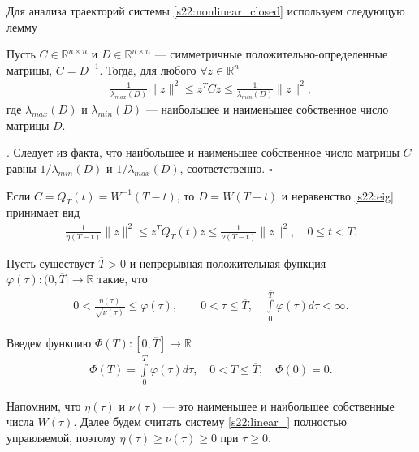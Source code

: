 \documentclass[../main.tex]{subfiles}
\begin{document}
Для анализа траекторий системы \eqref{s22:nonlinear_closed} используем следующую лемму
\begin{lemma}\label{s22:lem:zqz} 
 Пусть $C\in \mathbb{R}^{ n \times n}$ и $D\in \mathbb{R}^{n \times n}$ --- симметричные положительно-определенные матрицы, $C=D^{-1}$. 
Тогда, для любого $\forall z \in \mathbb{R}^{n}$ 
 \begin{gather} \label{s22:eig}
 \frac{1}{\lambda_{max}(D)} \|z\|^2 \leqslant z^T C z \leqslant \frac{1}{\lambda_{min}(D)} \|z\|^2,
 \end{gather}
 где $\lambda_{max}(D)$ и $\lambda_{min}(D)$ --- наибольшее и наименьшее собственное число матрицы $D$.
\end{lemma}
\doc. 
 Следует из факта, что наибольшее и наименьшее собственное число матрицы $C$ равны $1/{\lambda_{min}(D)}$ и $1/{\lambda_{max}(D)}$, соответственно. \hfill $ \square $

Если $C=Q_T(t)=W^{-1}(T-t)$, то $D=W(T-t)$ и неравенство \eqref{s22:eig} принимает вид
\begin{gather*} %
 \frac{1}{\eta(T-t)} \|z\|^2 \leqslant z^T Q_T(t) z \leqslant \frac{1}{\nu(T-t)} \|z\|^2, \quad 0\leqslant t < T.
 \end{gather*}
\begin{assumption} \label{s22:asm1} 
 Пусть существует $\overline{T}>0$ и непрерывная положительная функция $\varphi(\tau): (0, \overline{T}] \to \mathbb{R}$ такие, что
\begin{gather*}
 0 < \frac{\eta(\tau)}{\sqrt{\nu(\tau)}} \leqslant \varphi(\tau), \qquad 0 < \tau \leqslant \overline{T},\quad \int\limits_0^ {\overline{T}}\varphi(\tau) d\tau<\infty.
\end{gather*} 
\end{assumption}
Введем функцию $\Phi(T): [0, \overline{T}] \to \mathbb{R}$
\begin{gather*}
 \Phi(T)= \int\limits_0^ {T}\varphi(\tau) d\tau,\quad 0 < T \leqslant \overline{T},\quad \Phi(0)=0.
\end{gather*} 

Напомним, что $\eta(\tau)$ и $\nu(\tau)$ --- это наименьшее и наибольшее собственные числа $W(\tau)$. 
Далее будем считать систему \eqref{s22:linear_} полностью управляемой, поэтому $\eta(\tau) \geqslant \nu(\tau) \geqslant 0$ при $\tau \geq 0$.
 
\end{document}
